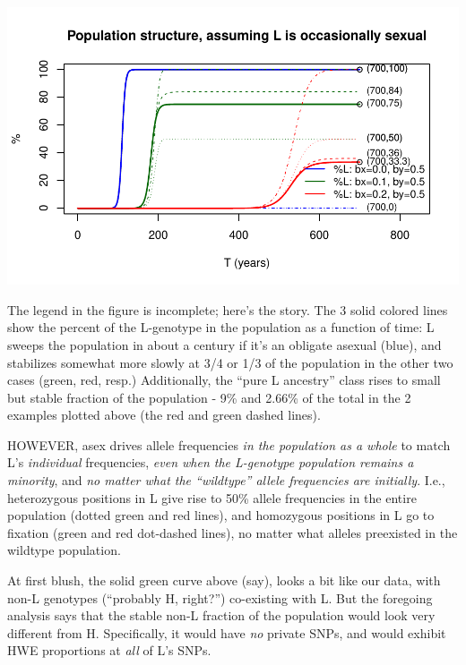 \documentclass{article}\usepackage[]{graphicx}\usepackage[]{color}
\makeatletter
\def\maxwidth{ %
  \ifdim\Gin@nat@width>\linewidth
    \linewidth
  \else
    \Gin@nat@width
  \fi
}
\newenvironment{knitrout}{}{} %
\makeatother
\begin{document}
\begin{knitrout}
{\centering \includegraphics[width=\maxwidth]{asex-figs-knitr/unnamed-chunk-16-1} 

}



\end{knitrout}

The legend in the figure is incomplete; here's the story.  The 3 solid colored lines show the
percent of the L-genotype in the population as a function of time: L sweeps the population in about
a century if it's an obligate asexual (blue), and stabilizes somewhat more slowly at 3/4 or 1/3 of
the population in the other two cases (green, red, resp.)  Additionally, the ``pure L ancestry''
class rises to small but stable fraction of the population - 9\% and 2.66\% of the total in the 2
examples plotted above (the red and green dashed lines).

HOWEVER, asex drives allele frequencies \textit{in the population as a whole} to match L's
\textit{individual} frequencies, \textit{even when the L-genotype population remains a minority},
and \textit{no matter what the ``wildtype'' allele frequencies are initially}.  I.e., heterozygous
positions in L give rise to 50\% allele frequencies in the entire population (dotted green and red
lines), and homozygous positions in L go to fixation (green and red dot-dashed lines), no matter
what alleles preexisted in the wildtype population.

At first blush, the solid green curve above (say), looks a bit like our data, with non-L genotypes
(``probably H, right?'') co-existing with L.  But the foregoing analysis says that the stable non-L
fraction of the population would look very different from H.  Specifically, it would have
\textit{no} private SNPs, and would exhibit HWE proportions at \textit{all} of L's SNPs.
\end{document}
